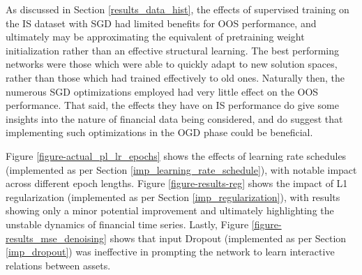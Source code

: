 \documentclass[a4paper,11pt,oneside]{article}
\theoremstyle{plain}
\theoremstyle{definition}
\begin{document}
	As discussed in Section \ref{results_data_hist}, the effects of supervised training on the IS dataset with SGD had limited benefits for OOS performance, and ultimately may be approximating the equivalent of pretraining weight initialization rather than an effective structural learning. The best performing networks were those which were able to quickly adapt to new solution spaces, rather than those which had trained effectively to old ones. Naturally then, the numerous SGD optimizations employed had very little effect on the OOS performance. That said, the effects they have on IS performance do give some insights into the nature of financial data being considered, and do suggest that implementing such optimizations in the OGD phase could be beneficial. \newline
		
	Figure \ref{figure-actual_pl_lr_epochs} shows the effects of learning rate schedules (implemented as per Section \ref{imp_learning_rate_schedule}), with notable impact across different epoch lengths. Figure \ref{figure-results-reg} shows the impact of L1 regularization (implemented as per Section \ref{imp_regularization}), with results showing only a minor potential improvement and ultimately highlighting the unstable dynamics of financial time series. Lastly, Figure \ref{figure-results_mse_denoising} shows that input Dropout (implemented as per Section \ref{imp_dropout}) was ineffective in prompting the network to learn interactive relations between assets.
		
\end{document}
